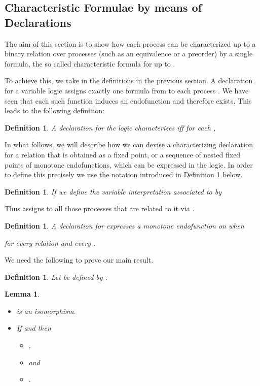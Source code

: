 \documentclass[submission]{eptcs}
\newtheorem{lemma}[theorem]{Lemma}
\newtheorem{definition}[theorem]{Definition}
\begin{document}
\subsection{Characteristic Formulae by means of
  Declarations}\label{sect:chargfp}
The aim of this section is to show how each process 
can be characterized up to a binary relation  over processes (such
as an equivalence or a preorder) by a single formula, the so called
characteristic formula for  up to .  

To achieve this, we take  in the definitions in the
previous section.  A declaration  for a variable logic 
assigns exactly one formula  from  to each process
.  We have seen that each such function induces an
endofunction
 and
therefore  exists. This leads to the following
definition:

\begin{definition}\label{D:char}
  A declaration  for the logic  characterizes
   iff for each ,

\end{definition}
\iffalse In our examples, we seek declarations that characterize a
relation, such as similarity or bisimilarity, which is of the form
, where  is a monotone endofunction on . \fi In what follows, we will describe how we can devise a
characterizing declaration for a relation that is obtained as a fixed
point, or a sequence of nested fixed points of monotone
endofunctions, which can be expressed in the logic.  In order to define
this precisely we use the notation introduced in Definition
\ref{Def:sigmaS} below.
\begin{definition}\label{Def:sigmaS}
If  we define the variable interpretation
 associated to  by

\end{definition}
Thus  assigns to  all those processes  that are related to it
via .
\begin{definition} \label{def:express} A declaration  for 
  \emph{expresses} a monotone endofunction  on  when

   for every relation  and every
   .
\end{definition}
We need the following to prove our main result.
\begin{definition}\label{def:isophi}
Let  be defined by
. 
\end{definition}
\begin{lemma}\label{L:x}\quad
\begin{itemize}
\item
  is an
 isomorphism.
\item If  and
   then 
\begin{itemize}
\item
, 
\item
 and
\item .
\end{itemize}
\end{itemize}
 \end{lemma}
\end{document}
